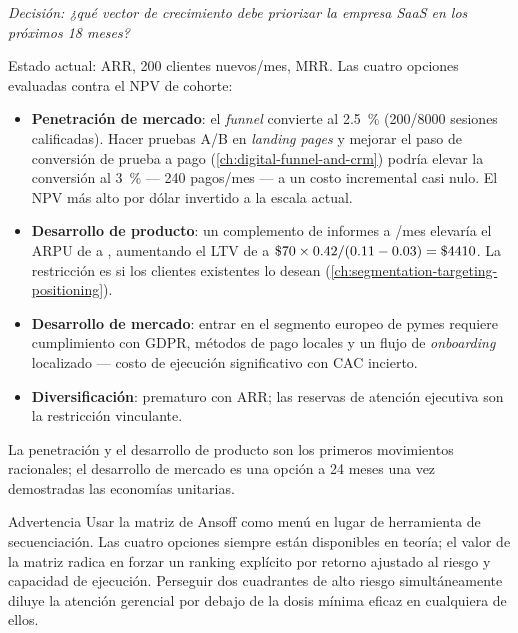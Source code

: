 \begin{example}
\emph{Decisión: ¿qué vector de crecimiento debe priorizar la empresa SaaS en los próximos
18 meses?}

Estado actual:  ARR, \num{200} clientes nuevos/mes,  MRR.
Las cuatro opciones evaluadas contra el NPV de cohorte:

\begin{itemize}
  \item \textbf{Penetración de mercado}: el \emph{funnel} convierte al \qty{2.5}{\percent}
        (200/8000 sesiones calificadas). Hacer pruebas A/B en \emph{landing pages} y
        mejorar el paso de conversión de prueba a pago (\cref{ch:digital-funnel-and-crm})
        podría elevar la conversión al \qty{3}{\percent} --- 240 pagos/mes --- a un costo
        incremental casi nulo. El NPV más alto por dólar invertido a la escala actual.
  \item \textbf{Desarrollo de producto}: un complemento de informes a /mes
        elevaría el ARPU de  a , aumentando el LTV de  a
        \(\$\num{70}\times 0.42/(0.11-0.03) = \$\num{4410}\). La restricción es si los
        clientes existentes lo desean
        (\cref{ch:segmentation-targeting-positioning}).
  \item \textbf{Desarrollo de mercado}: entrar en el segmento europeo de pymes requiere
        cumplimiento con GDPR, métodos de pago locales y un flujo de \emph{onboarding}
        localizado --- costo de ejecución significativo con CAC incierto.
  \item \textbf{Diversificación}: prematuro con  ARR; las reservas de
        atención ejecutiva son la restricción vinculante.
\end{itemize}

La penetración y el desarrollo de producto son los primeros movimientos racionales; el
desarrollo de mercado es una opción a 24 meses una vez demostradas las economías unitarias.
\end{example}

\begin{admonition}{Advertencia}
Usar la matriz de Ansoff como menú en lugar de herramienta de secuenciación. Las cuatro
opciones siempre están disponibles en teoría; el valor de la matriz radica en forzar un
ranking explícito por retorno ajustado al riesgo y capacidad de ejecución. Perseguir dos
cuadrantes de alto riesgo simultáneamente diluye la atención gerencial por debajo de la
dosis mínima eficaz en cualquiera de ellos.
\end{admonition}

